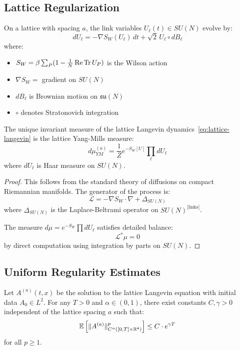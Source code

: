\subsection{Lattice Regularization}

\begin{definition}
On a lattice with spacing $a$, the link variables $U_\ell(t) \in SU(N)$ evolve by:
\begin{equation}
\label{eq:lattice-langevin}
dU_\ell = -\nabla S_W(U_\ell) \, dt + \sqrt{2} \, U_\ell \circ dB_\ell
\end{equation}
where:
\begin{itemize}
\item $S_W = \beta \sum_P (1 - \frac{1}{N}\operatorname{Re}\operatorname{Tr} U_P)$ is the Wilson action
\item $\nabla S_W = $ gradient on $SU(N)$
\item $dB_\ell$ is Brownian motion on $\mathfrak{su}(N)$
\item $\circ$ denotes Stratonovich integration
\end{itemize}
\end{definition}

\begin{theorem}
\label{thm:invariant-measure}
The unique invariant measure of the lattice Langevin dynamics~\eqref{eq:lattice-langevin} 
is the lattice Yang-Mills measure:
\[
d\mu_{YM}^{(a)} = \frac{1}{Z} e^{-S_W[U]} \prod_\ell dU_\ell
\]
where $dU_\ell$ is Haar measure on $SU(N)$.
\end{theorem}

\begin{proof}
This follows from the standard theory of diffusions on compact Riemannian 
manifolds. The generator of the process is:
\[
\mathcal{L} = -\nabla S_W \cdot \nabla + \Delta_{SU(N)}
\]
where $\Delta_{SU(N)}$ is the Laplace-Beltrami operator on $SU(N)^{|\text{links}|}$.

The measure $d\mu = e^{-S_W} \prod dU_\ell$ satisfies detailed balance:
\[
\mathcal{L}^* \mu = 0
\]
by direct computation using integration by parts on $SU(N)$.
\end{proof}

\subsection{Uniform Regularity Estimates}

\begin{theorem}
\label{thm:schauder}
Let $A^{(a)}(t, x)$ be the solution to the lattice Langevin equation with 
initial data $A_0 \in L^2$. For any $T > 0$ and $\alpha \in (0, 1)$, there 
exist constants $C, \gamma > 0$ independent of the lattice spacing $a$ such that:
\[
\mathbb{E}\left[\|A^{(a)}\|_{C^{\alpha}([0,T] \times \mathbb{R}^4)}^p\right] \leq C \cdot e^{\gamma T}
\]
for all $p \geq 1$.
\end{theorem}

